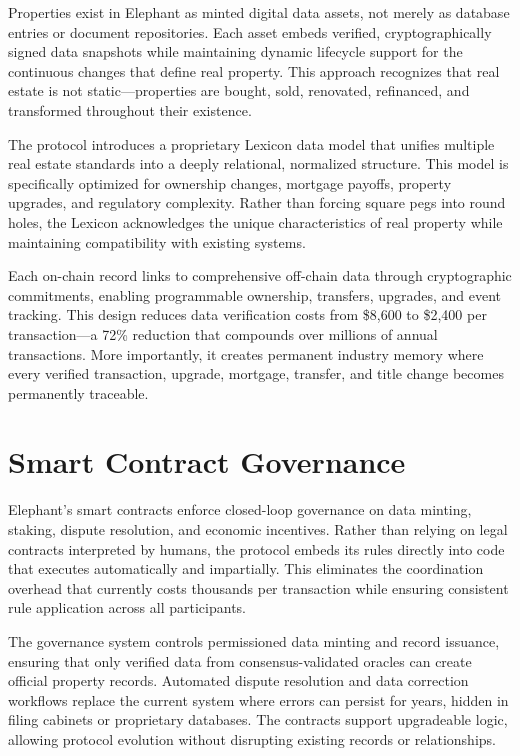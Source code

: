 Properties exist in Elephant as minted digital data assets, not merely as database entries or document repositories. Each asset embeds verified, cryptographically signed data snapshots while maintaining dynamic lifecycle support for the continuous changes that define real property. This approach recognizes that real estate is not static—properties are bought, sold, renovated, refinanced, and transformed throughout their existence.

The protocol introduces a proprietary Lexicon data model that unifies multiple real estate standards into a deeply relational, normalized structure. This model is specifically optimized for ownership changes, mortgage payoffs, property upgrades, and regulatory complexity. Rather than forcing square pegs into round holes, the Lexicon acknowledges the unique characteristics of real property while maintaining compatibility with existing systems.

Each on-chain record links to comprehensive off-chain data through cryptographic commitments, enabling programmable ownership, transfers, upgrades, and event tracking. This design reduces data verification costs from \$8,600 to \$2,400 per transaction—a 72\% reduction that compounds over millions of annual transactions. More importantly, it creates permanent industry memory where every verified transaction, upgrade, mortgage, transfer, and title change becomes permanently traceable.

\section{Smart Contract Governance}

Elephant's smart contracts enforce closed-loop governance on data minting, staking, dispute resolution, and economic incentives. Rather than relying on legal contracts interpreted by humans, the protocol embeds its rules directly into code that executes automatically and impartially. This eliminates the coordination overhead that currently costs thousands per transaction while ensuring consistent rule application across all participants.

The governance system controls permissioned data minting and record issuance, ensuring that only verified data from consensus-validated oracles can create official property records. Automated dispute resolution and data correction workflows replace the current system where errors can persist for years, hidden in filing cabinets or proprietary databases. The contracts support upgradeable logic, allowing protocol evolution without disrupting existing records or relationships.


